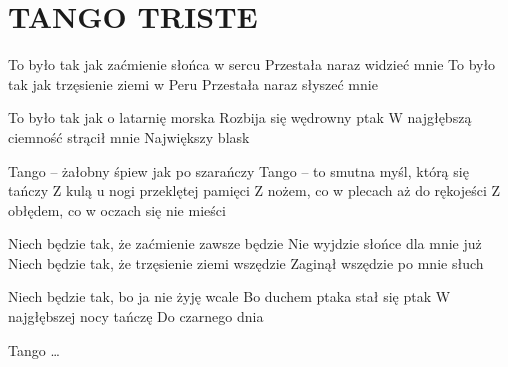 \documentclass[../../../songbook.tex]{subfiles}
\begin{document}
\TabPositions{8cm} %
\section*{TANGO TRISTE}
{}
\vspace{0.5cm}
To było tak jak zaćmienie słońca w sercu		 \newline    
Przestała naraz widzieć mnie					 \newline                    
To było tak jak trzęsienie ziemi w Peru			 \newline    
Przestała naraz słyszeć mnie					 \newline                     

To było tak jak o latarnię morska    	\newline                  
Rozbija się wędrowny ptak                \newline   	              
W najgłębszą ciemność strącił mnie       \newline           
Największy blask                         \newline                        

\-\hspace{1cm}Tango – żałobny śpiew jak po szarańczy	 \newline            
\-\hspace{1cm}Tango – to smutna myśl, którą się tańczy	      \newline    
\-\hspace{1cm}Z kulą u nogi przeklętej pamięci			    \newline                 
\-\hspace{1cm}Z nożem, co w plecach aż do rękojeści 		  \newline          
\-\hspace{1cm}Z obłędem, co w oczach się nie mieści		 \newline       

Niech będzie tak, że zaćmienie zawsze będzie        \newline 
Nie wyjdzie słońce dla mnie już                       \newline            
Niech będzie tak, że trzęsienie ziemi wszędzie       \newline 
Zaginął wszędzie po mnie słuch                       \newline     

Niech będzie tak, bo ja nie żyję wcale              \newline   
Bo duchem ptaka stał się ptak                    \newline        
W najgłębszej nocy tańczę                       \newline             
Do czarnego dnia                                \newline                  

\-\hspace{1cm}Tango …
\end{document}
